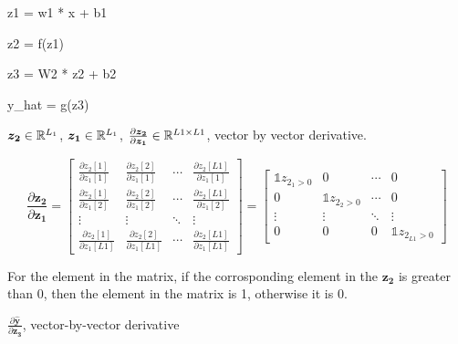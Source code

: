 

z1 = w1 * x + b1

z2 = f(z1)

z3 = W2 * z2 + b2

y\_hat = g(z3)


$\bm{z_2} \in \mathbb{R}^{L_1} $, $\bm{z_1} \in \mathbb{R}^{L_1} $, $\frac{\partial \bm{z_2}}{\partial \bm{z_1}} \in \mathbb{R}^{L1 \times L1}$, vector by vector derivative.

\begin{equation}
    \frac{\partial \mathbf{z_2}}{\partial \mathbf{z_1}}
    =
    \left[\begin{array}{cccc}
        \frac{\partial z_{2}{[1]}}{\partial z_{1}{[1]}} & \frac{\partial z_{2}{[2]}}{\partial z_{1}{[1]}} & \cdots & \frac{\partial z_{2}{[L1]}}{\partial z_{1}{[1]}} \\
        \frac{\partial z_{2}{[1]}}{\partial z_{1}{[2]}} & \frac{\partial z_{2}{[2]}}{\partial z_{1}{[2]}} & \cdots & \frac{\partial z_{2}{[L1]}}{\partial z_{1}{[2]}} \\
        \vdots & \vdots & \ddots & \vdots \\
        \frac{\partial z_{2}{[1]}}{\partial z_{1}{[L1]}} & \frac{\partial z_{2}{[2]}}{\partial z_{1}{[L1]}} & \cdots & \frac{\partial z_{2}{[L1]}}{\partial z_{1}{[L1]}}
    \end{array}\right]
    = 
    \left[
        \begin{array}{cccc}
            \mathbb{1} z_{2_{1} > 0} & 0 & \cdots & 0 \\
            0 & \mathbb{1} z_{2_{2} > 0} & \cdots & 0 \\
            \vdots & \vdots & \ddots & \vdots \\
            0 & 0 & 0 &\mathbb{1} z_{2_{L1} > 0}  
        \end{array}
    \right]
\end{equation}

For the element in the matrix, if the corrosponding element in the $\bm{z_2}$ is greater than 0, then the element in the matrix is 1, otherwise it is 0.



$\frac{\partial \bm{\hat y}}{\partial \bm{z_3}}$,  vector-by-vector derivative

